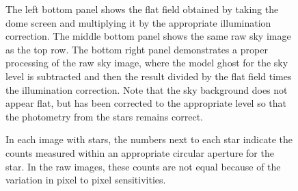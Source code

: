 \documentclass[12pt,preprint]{aastex}
\begin{document}
\begin{figure}[htbp]
{The left bottom panel shows the flat field obtained by taking the dome
screen and multiplying it by the appropriate illumination
correction. The middle bottom panel shows the same raw sky image as
the top row. The bottom right panel demonstrates a proper processing
of the raw sky image, where the model ghost for the sky level is
subtracted and then the result divided by the flat field times the
illumination correction. Note that the sky background does not appear
flat, but has been corrected to the appropriate level so that the
photometry from the stars remains correct. 

In each image with stars, the numbers next to each star indicate the
counts measured within an appropriate circular aperture for the
star. In the raw images, these counts are not equal because of the
variation in pixel to pixel sensitivities. 




}
\end{figure}
\end{document}
